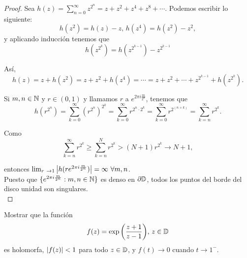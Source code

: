 \begin{proof}
     Sea $h(z) = \sum_{n=0}^{\infty} z^{2^n} = z + z^2 + z^4 + z^8 + \cdots$. Podemos escribir lo siguiente:
    \begin{equation*}
         h(z^2) = h(z) - z, \,
         h(z^4) = h(z^2) - z^2,
    \end{equation*}
    y aplicando inducción tenemos que
    \begin{equation*}
        h(z^{2^k}) = h(z^{2^{k-1}}) - z^{2^{k-1}}
    \end{equation*}

    Así,
    \begin{equation*}
        h(z) = z + h(z^2) = z + z^2 + h(z^4) = \cdots = z + z^2 + \cdots + z^{2^{k-1}} + h(z^{2^k}).
    \end{equation*}

    Si $m, n \in \mathbb{N}$ y $r \in (0,1)$ y llamamos $r$ a $e^{2 \pi i \frac{m}{2^n}}$, tenemos que
    \begin{equation*}
        h(r^{2^n}) = \sum_{k=0}^{\infty} (r^{2^n})^{2^k} = \sum_{k=0}^{\infty} r^{2^n \cdot 2^k} = \sum_{k=0}^{\infty} r^{2^{(n+k)}} =  \sum_{k=n}^{\infty} r^{2^k}.
    \end{equation*}

    Como
    \begin{equation*}
        \sum_{k=n}^{\infty} r^{2^k} \geq \sum_{k=n}^{N} r^{2^k} > (N + 1) r^{2^k} \to N + 1,
    \end{equation*}

    entonces $\lim_{r \to 1} \abs{h(re^{2 \pi i \frac{m}{2^n}})} = \infty \, \, \forall m, n$. \\

    Puesto que $\{e^{2 \pi i \frac{m}{2^n}} : m, n \in \mathbb{N}\}$ es denso en $\partial \mathbb{D}$, todos los puntos del borde del disco unidad son singulares. \\
\end{proof}


\begin{example}
    Mostrar que la función
    \begin{equation*}
        f(z) = \exp{\left(\frac{z + 1}{z - 1}\right)}, \, z \in \mathbb{D}
    \end{equation*}
    es holomorfa, $\left\lvert f(z)\right\rvert < 1$ para todo $z \in \mathbb{D}$, y $f(t) \to 0$ cuando $t \to 1^-$. %
\end{example}

